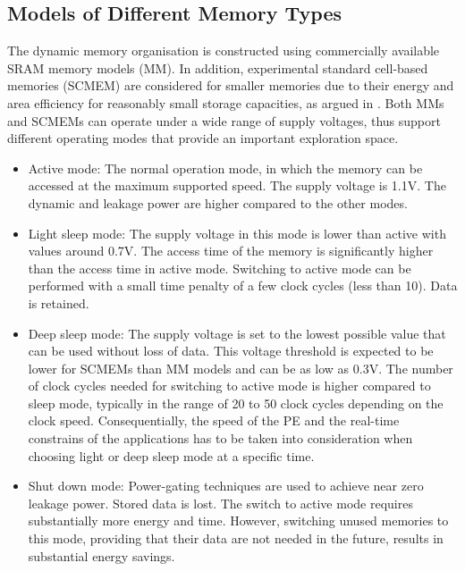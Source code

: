\documentclass[a4paper,conference]{IEEEtran}
\begin{document}
\subsection{Models of Different Memory Types}
The dynamic memory organisation is constructed using commercially available SRAM memory models (MM). In addition, experimental standard cell-based memories (SCMEM) \cite{Mei11}  are  considered for smaller memories due to their energy and area efficiency for reasonably small storage capacities, as argued in \cite{Mei10}. Both MMs and SCMEMs can operate under a wide range of supply voltages, thus support different operating modes that provide an important exploration space.
\begin{itemize}
\item Active mode: The normal operation mode, in which the memory can be accessed at the maximum supported speed. The supply voltage is 1.1V. The dynamic and leakage power are higher compared to the other modes.
\item Light sleep mode: The supply voltage in this mode is lower than active with values around 0.7V. The access time of the memory is significantly higher than the access time in active mode. Switching to active mode can be performed with a small time penalty of a few clock cycles (less than 10). Data is retained.  
\item Deep sleep mode: The supply voltage is set to the lowest possible value that can be used without loss of data. This voltage threshold is expected to be lower for SCMEMs than MM models and can be as low as 0.3V. The number of clock cycles needed for switching to active mode is higher compared to sleep mode, typically in the range of 20 to 50 clock cycles depending on the clock speed. Consequentially, the speed of the PE and the real-time constrains of the applications has to be taken into consideration when choosing light or deep sleep mode at a specific time.  
\item Shut down mode: Power-gating techniques are used to achieve near zero leakage power. Stored data is lost. The switch to active mode requires substantially more energy and time. However, switching unused memories to this mode, providing that their data are not needed in the future, results in substantial energy savings.
\end{itemize}  
\end{document}
